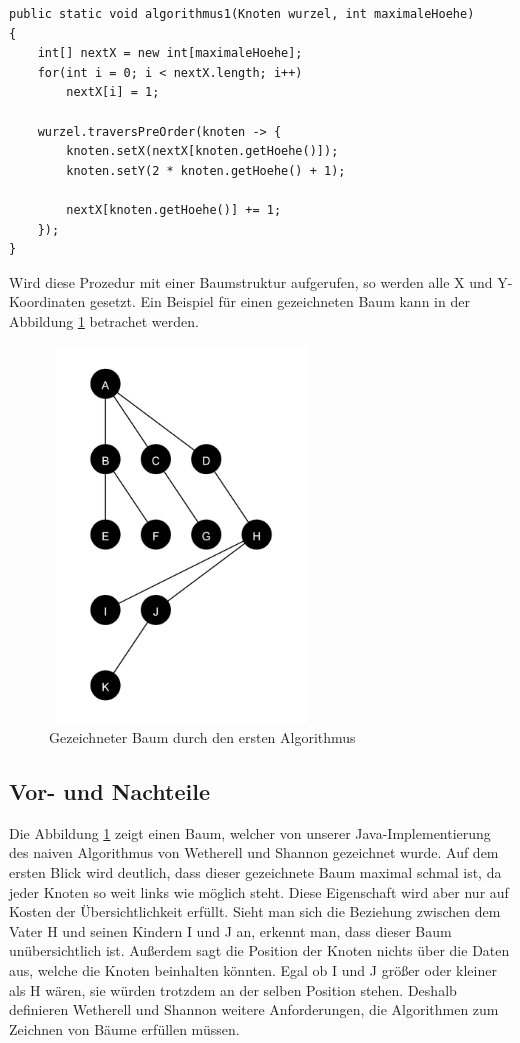 \begin{lstlisting}[caption=Implementierung des naiven Algorithmuses]
public static void algorithmus1(Knoten wurzel, int maximaleHoehe) 
{
	int[] nextX = new int[maximaleHoehe];
	for(int i = 0; i < nextX.length; i++)
		nextX[i] = 1;
	
	wurzel.traversPreOrder(knoten -> {
		knoten.setX(nextX[knoten.getHoehe()]);
		knoten.setY(2 * knoten.getHoehe() + 1);
		
		nextX[knoten.getHoehe()] += 1;
	});
}
\end{lstlisting}

Wird diese Prozedur mit einer Baumstruktur aufgerufen, so werden alle X und Y-Koordinaten gesetzt.
Ein Beispiel für einen gezeichneten Baum kann in der Abbildung \ref{pic:baum_algo_1} betrachet werden.

\begin{figure}[H]
    \centering
    \includegraphics[width=7cm, height=10cm]{abbildungen/baum_algo_1}
    \caption{Gezeichneter Baum durch den ersten Algorithmus}
    \label{pic:baum_algo_1} 
\end{figure}

\subsection{Vor- und Nachteile}
Die Abbildung \ref{pic:baum_algo_1} zeigt einen Baum, welcher von unserer Java-Implementierung des naiven Algorithmus von Wetherell und Shannon
gezeichnet wurde.
Auf dem ersten Blick wird deutlich, dass dieser gezeichnete Baum maximal schmal ist, da jeder Knoten so weit links wie möglich steht.
Diese Eigenschaft wird aber nur auf Kosten der Übersichtlichkeit erfüllt. Sieht man sich die Beziehung zwischen dem Vater H und seinen Kindern
I und J an, erkennt man, dass dieser Baum unübersichtlich ist. Außerdem sagt die Position der Knoten nichts über die Daten aus, welche die Knoten
beinhalten könnten. Egal ob I und J größer oder kleiner als H wären, sie würden trotzdem an der selben Position stehen. Deshalb definieren
Wetherell und Shannon weitere Anforderungen, die Algorithmen zum Zeichnen von Bäume erfüllen müssen.

